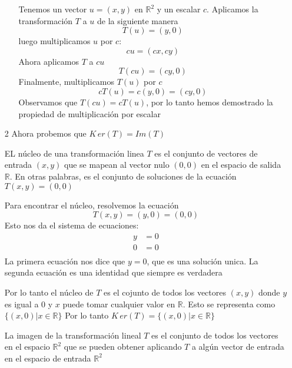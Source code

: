 \begin{enumerate}
\begin{itemize}
        Tenemos un vector $u  =(x,y)$ en $\mathbb{R}^2$ y un escalar $c$. Aplicamos la transformación $T$ a $u$ de la siguiente manera
        \begin{equation*}
            T(u) = (y,0)
        \end{equation*}
        luego multiplicamos $u$ por $c$:
        \begin{equation*}
            cu = (cx, cy)
        \end{equation*}
        Ahora aplicamos $T$ a $cu$
        \begin{equation*}
            T(cu) = (cy,0)
        \end{equation*}
        Finalmente, multiplicamos $T(u)$ por $c$
        \begin{equation*}
            cT(u) = c(y,0) = (cy, 0)
        \end{equation*}
        Observamos que $T(cu) = cT(u)$, por lo tanto hemos demostrado la propiedad de multiplicación por escalar
    \end{itemize}

    \item[2] Ahora probemos que $K\,er(T) = Im(T)$
    
    EL núcleo de una transformación linea $T$ es el conjunto
    de vectores de entrada $(x,y)$ que se mapean al vector nulo
    $(0,0)$ en el espacio de salida $\mathbb{R}$. En otras palabras, 
    es el conjunto de soluciones de la ecuación $T(x,y) = (0,0)$

    Para encontrar el núcleo, resolvemos la ecuación
    \begin{equation*}
        T(x,y) = (y,0) = (0,0)
    \end{equation*}
    Esto nos da el sistema de ecuaciones:
    \begin{align*}
        y & = 0 \\
        0 & = 0 \\
    \end{align*}
    La primera ecuación nos dice que $y = 0$, que es una solución unica. 
    La segunda ecuación es una identidad que siempre es verdadera

    Por lo tanto el núcleo de $T$ es el cojunto de todos los vectores
    $(x,y)$ donde $y$ es igual a $0$ y $x$ puede tomar cualquier valor
    en $\mathbb{R}$. Esto se representa como $\{ (x,0) | x \in \mathbb{R} \}$
    Por lo tanto $K\,er(T) = \{ (x,0) | x \in \mathbb{R} \}$

    La imagen de la transformación lineal $T$ es el conjunto 
    de todos los vectores en el espacio $\mathbb{R}^{2}$ que se pueden 
    obtener aplicando $T$ a algún vector de entrada en el espacio
    de entrada $\mathbb{R}^{2}$


\end{enumerate}
